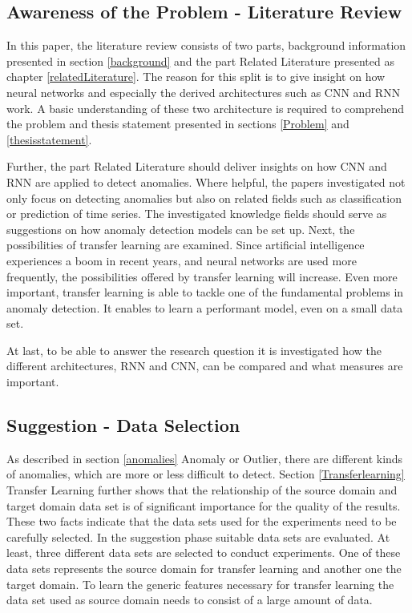 \newpage
\subsection{Awareness of the Problem - Literature Review}
In this paper, the literature review consists of two parts, background information presented in section \ref{background} and the part Related Literature presented as chapter \ref{relatedLiterature}. The reason for this split is to give insight on how neural networks and especially the derived architectures such as CNN and RNN work. A basic understanding of these two architecture is required to comprehend the problem and thesis statement presented in sections \ref{Problem} and \ref{thesisstatement}. 

Further, the part Related Literature should deliver insights on how CNN and RNN are applied to detect anomalies. Where helpful, the papers investigated not only focus on detecting anomalies but also on related fields such as classification or prediction of time series. The investigated knowledge fields should serve as suggestions on how anomaly detection models can be set up. Next, the possibilities of transfer learning are examined. Since artificial intelligence experiences a boom in recent years, and neural networks are used more frequently, the possibilities offered by transfer learning will increase. Even more important, transfer learning is able to tackle one of the fundamental problems in anomaly detection. It enables to learn a performant model, even on a small data set. 

At last, to be able to answer the research question it is investigated how the different architectures, RNN and CNN, can be compared and what measures are important. 

\subsection{Suggestion - Data Selection}
As described in section \ref{anomalies} Anomaly or Outlier, there are different kinds of anomalies, which are more or less difficult to detect. Section \ref{Transferlearning} Transfer Learning further shows that the relationship of the source domain and target domain data set is of significant importance for the quality of the results. These two facts indicate that the data sets used for the experiments need to be carefully selected. In the suggestion phase suitable data sets are evaluated. At least, three different data sets are selected to conduct experiments. One of these data sets represents the source domain for transfer learning and another one the target domain. To learn the generic features necessary for transfer learning the data set used as source domain needs to consist of a large amount of data.

